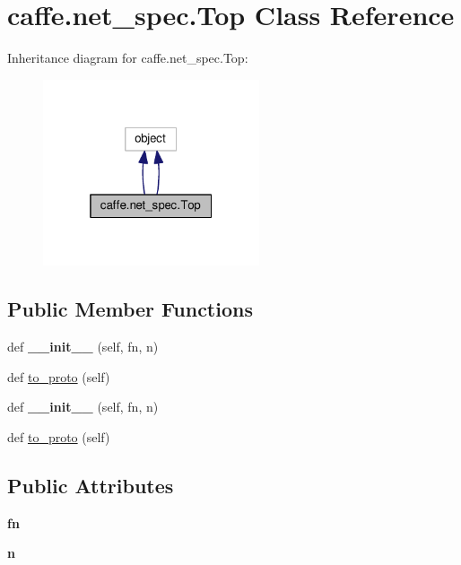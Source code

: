 \hypertarget{classcaffe_1_1net__spec_1_1_top}{}\section{caffe.\+net\+\_\+spec.\+Top Class Reference}
\label{classcaffe_1_1net__spec_1_1_top}


Inheritance diagram for caffe.\+net\+\_\+spec.\+Top\+:
\nopagebreak
\begin{figure}[H]
\begin{center}
\leavevmode
\includegraphics[width=181pt]{classcaffe_1_1net__spec_1_1_top__inherit__graph}
\end{center}
\end{figure}
\subsection*{Public Member Functions}
\begin{DoxyCompactItemize}
\item 
\mbox{\label{classcaffe_1_1net__spec_1_1_top_aa5b0dc0b2e047c70f79cdd51b4135b04}} 
def {\bfseries \+\_\+\+\_\+init\+\_\+\+\_\+} (self, fn, n)
\item 
def \mbox{\hyperlink{classcaffe_1_1net__spec_1_1_top_a90b516f1772cd633670ec8c06118ad49}{to\+\_\+proto}} (self)
\item 
\mbox{\label{classcaffe_1_1net__spec_1_1_top_aa5b0dc0b2e047c70f79cdd51b4135b04}} 
def {\bfseries \+\_\+\+\_\+init\+\_\+\+\_\+} (self, fn, n)
\item 
def \mbox{\hyperlink{classcaffe_1_1net__spec_1_1_top_a90b516f1772cd633670ec8c06118ad49}{to\+\_\+proto}} (self)
\end{DoxyCompactItemize}
\subsection*{Public Attributes}
\begin{DoxyCompactItemize}
\item 
\mbox{\label{classcaffe_1_1net__spec_1_1_top_a19061663296a04172dd228c3e2afdc09}} 
{\bfseries fn}
\item 
\mbox{\label{classcaffe_1_1net__spec_1_1_top_a69e81dadc303fd9d600472d51a8b9a6f}} 
{\bfseries n}
\end{DoxyCompactItemize}


